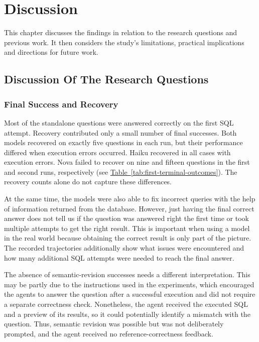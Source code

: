 \section{Discussion}
\label{sec:discussion}

This chapter discusses the findings in relation to the research questions
and previous work. It then considers the study's limitations,
practical implications and directions for future work.

\subsection{Discussion Of The Research Questions}
\label{sec:discussion-rqs}

\subsubsection{Final Success and Recovery}

Most of the standalone questions were answered correctly on the first SQL attempt. 
Recovery contributed only a small number of final successes. 
Both models recovered on exactly five questions in each run, 
but their performance differed when execution errors occurred. 
Haiku recovered in all cases with execution errors. 
Nova failed to recover on nine and fifteen questions in the first and second runs, 
respectively (see \hyperref[tab:first-terminal-outcomes]{Table~\ref*{tab:first-terminal-outcomes}}). 
The recovery counts alone do not capture these differences.

At the same time, the models were also able to fix incorrect queries 
with the help of information returned from the database. 
However, just having the final correct answer does not tell us 
if the question was answered right the first time or took multiple attempts to get the right result. 
This is important when using a model in the real world because obtaining 
the correct result is only part of the picture. 
The recorded trajectories additionally show what issues were encountered 
and how many additional SQL attempts were needed to reach the final answer.

The absence of semantic-revision successes needs a different interpretation. 
This may be partly due to the instructions used in the experiments, 
which encouraged the agents to answer the question after a successful execution 
and did not require a separate correctness check. 
Nonetheless, the agent received the executed SQL and a preview of its results, 
so it could potentially identify a mismatch with the question. 
Thus, semantic revision was possible but was not deliberately prompted, 
and the agent received no reference-correctness feedback.

